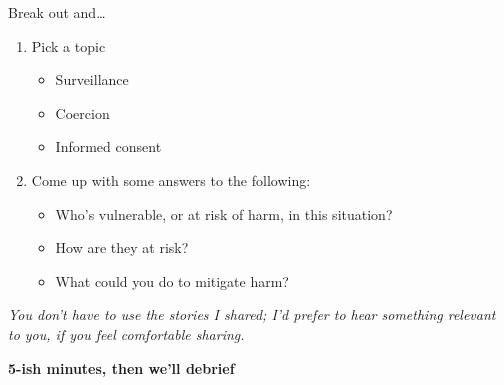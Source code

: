\documentclass[main]{subfiles}
\begin{document}
\begin{frame}[t]{Break out and\dots}
    

\centering

\vspace{2em}







{\large \bfseries

\begin{enumerate}
  \item Pick a topic
  {\mdseries \begin{itemize}
      \item Surveillance
      \item Coercion
      \item Informed consent
    \end{itemize}}
  \item Come up with some answers to the following:
    {\mdseries \begin{itemize}
        \item Who's vulnerable, or at risk of harm, in this situation?
        \item How are they at risk?
        \item What could you do to mitigate harm?

      \end{itemize}}
\end{enumerate}
}

\emph{\footnotesize You don't have to use the stories I shared; I'd prefer to hear something relevant to you, if you feel comfortable sharing.}

\vfill

{\LARGE \bfseries 5-ish minutes, then we'll debrief}


\end{frame}
\end{document}
